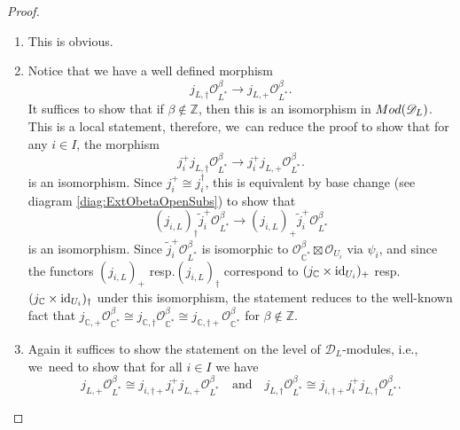 \documentclass[11pt]{article}
\newcommand{\ie}{i.e.,\xspace}
\newcommand{\resp}{resp.\xspace}
\newcommand{\skpt}{\smallskip}
\let\mathds\mathbb
\newcommand{\quand}{\quad\text{and}\quad}
\newcommand{\dC}{{\mathds C}}\let\C\dC
\newcommand{\dZ}{{\mathds Z}}\let\mbz\dZ\let\Z\dZ
\newcommand{\cD}{\mathscr{D}}
\newcommand{\cO}{\mathcal{O}}\let\O\cO
\DeclareMathOperator{\id}{\textup{id}}
\begin{document}
\skpt
\begin{proof}
\begin{enumerate}
\item
This is obvious.

\item
Notice that we have a well defined morphism
\[
j_{L,\dag} \cO_{L^*}^\beta \to j_{L,+} \cO_{L^*}^\beta.
\]
It suffices to show that if $\beta\notin\Z$, then this is an isomorphism in $\textup{Mod}(\cD_L)$. This is a local statement, therefore, we~can reduce the proof to show that for any $i\in I$, the morphism
\[
j_i^+j_{L,\dag} \cO_{L^*}^\beta \to j_i^+j_{L,+} \cO_{L^*}^\beta.
\]
is an isomorphism. Since $j_i^+\cong j_i^\dag$, this is equivalent by base change (see diagram \eqref{diag:ExtObetaOpenSubs}) to show that
\[
(j_{i,L})_\dag\tilde{j}_i^+ \cO_{L^*}^\beta \to
(j_{i,L})_+\tilde{j}_i^+ \cO_{L^*}^\beta
\]
is an isomorphism. Since $\tilde{j}_i^+ \cO_{L^*}^\beta$ is isomorphic to
$\cO^\beta_{\dC^*}\boxtimes \cO_{U_i}$ via $\psi_i$, and since the functors $(j_{i,L})_+$ \resp $(j_{i,L})_\dag$ correspond to $(j_\dC\times\id_{U_i})_+$ \resp $(j_\dC\times\id_{U_i})_\dag$ under this isomorphism, the statement reduces to the well-known fact that
$j_{\dC,+}\cO_{\dC^*}^\beta\cong j_{\dC,\dag}\cO_{\dC^*}^\beta\cong j_{\dC,\dag+}\cO^\beta_{\dC^*}$ for $\beta\notin\dZ$.
\item

Again it suffices to show the statement on the level of $\cD_L$\nobreakdash-mod\-ules, \ie we~need to show that for all $i\in I$ we have
\begin{equation}\label{eq:MinExt}
j_{L,+} \cO^\beta_{L^{*}} \cong j_{i,\dag+} j_i^+ j_{L,+} \cO^\beta_{L^{*}}
\quand
j_{L,\dag} \cO^\beta_{L^{*}} \cong
j_{i,\dag+} j_i^+ j_{L,\dag} \cO^\beta_{L^{*}}.
\end{equation}


\end{enumerate}
\end{proof}
\end{document}
